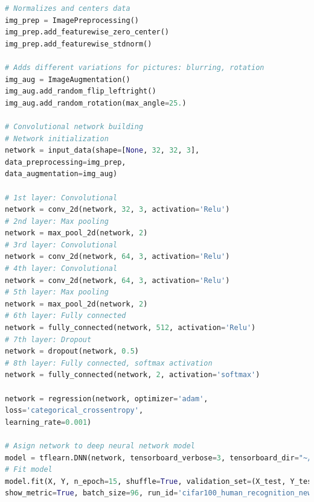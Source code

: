 \begin{lstlisting}[caption= Code used to import and train the model classifying humans from no humnans, label=fullCode, basicstyle=\ttfamily\tiny, language=Python, stringstyle=\ttfamily,]
# Normalizes and centers data
img_prep = ImagePreprocessing()
img_prep.add_featurewise_zero_center()
img_prep.add_featurewise_stdnorm()

# Adds different variations for pictures: blurring, rotation
img_aug = ImageAugmentation()
img_aug.add_random_flip_leftright()
img_aug.add_random_rotation(max_angle=25.)

# Convolutional network building
# Network initialization
network = input_data(shape=[None, 32, 32, 3],
data_preprocessing=img_prep,
data_augmentation=img_aug)

# 1st layer: Convolutional
network = conv_2d(network, 32, 3, activation='Relu')
# 2nd layer: Max pooling
network = max_pool_2d(network, 2)
# 3rd layer: Convolutional
network = conv_2d(network, 64, 3, activation='Relu')
# 4th layer: Convolutional
network = conv_2d(network, 64, 3, activation='Relu')
# 5th layer: Max pooling
network = max_pool_2d(network, 2)
# 6th layer: Fully connected
network = fully_connected(network, 512, activation='Relu')
# 7th layer: Dropout
network = dropout(network, 0.5)
# 8th layer: Fully connected, softmax activation
network = fully_connected(network, 2, activation='softmax')

network = regression(network, optimizer='adam',
loss='categorical_crossentropy',
learning_rate=0.001)

# Asign network to deep neural network model
model = tflearn.DNN(network, tensorboard_verbose=3, tensorboard_dir="~/Documents/tf_logs")
# Fit model
model.fit(X, Y, n_epoch=15, shuffle=True, validation_set=(X_test, Y_test),
show_metric=True, batch_size=96, run_id='cifar100_human_recognition_new_15ep_Relu')

\end{lstlisting}